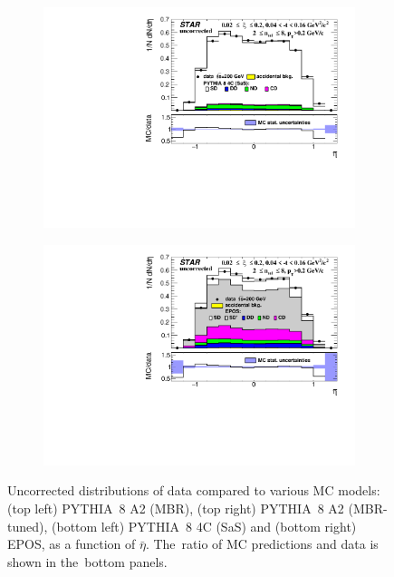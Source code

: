 \begin{figure}[t!]
\begin{subfigure}{.49\textwidth}
		\includegraphics[width=\linewidth, page=1]{chapters/chrgSTAR/img/nonSD/SDT_pythia_xi0_sas_RP_starsim_eta.pdf}
	\end{subfigure}
	\begin{subfigure}{.49\textwidth}
		\includegraphics[width=\linewidth, page=1]{chapters/chrgSTAR/img/nonSD/chrg/SDT_epos_xi0_RP_starsim_eta.pdf}
	\end{subfigure}
		\caption{Uncorrected distributions of data compared to various MC models: (top left) PYTHIA~8 A2 (MBR), (top right) PYTHIA~8 A2 (MBR-tuned), (bottom left) PYTHIA~8 4C (SaS) and (bottom right) EPOS, as a function of $\bar{\eta}$. The~ratio of MC predictions and data is shown in the~bottom panels.}
		\label{fig:nonSDera}
	
\end{figure}
